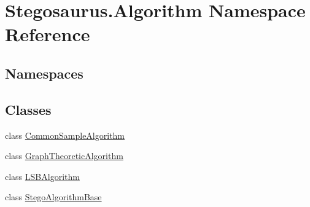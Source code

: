 \hypertarget{namespace_stegosaurus_1_1_algorithm}{}\section{Stegosaurus.\+Algorithm Namespace Reference}
\label{namespace_stegosaurus_1_1_algorithm}
\subsection*{Namespaces}
\begin{DoxyCompactItemize}
\end{DoxyCompactItemize}
\subsection*{Classes}
\begin{DoxyCompactItemize}
\item 
class \hyperlink{class_stegosaurus_1_1_algorithm_1_1_common_sample_algorithm}{Common\+Sample\+Algorithm}
\item 
class \hyperlink{class_stegosaurus_1_1_algorithm_1_1_graph_theoretic_algorithm}{Graph\+Theoretic\+Algorithm}
\item 
class \hyperlink{class_stegosaurus_1_1_algorithm_1_1_l_s_b_algorithm}{L\+S\+B\+Algorithm}
\item 
class \hyperlink{class_stegosaurus_1_1_algorithm_1_1_stego_algorithm_base}{Stego\+Algorithm\+Base}
\end{DoxyCompactItemize}
